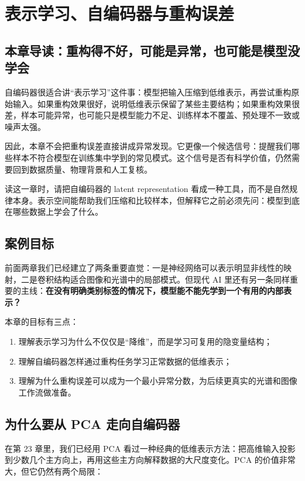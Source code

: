 \chapter{表示学习、自编码器与重构误差}

\section{本章导读：重构得不好，可能是异常，也可能是模型没学会}

自编码器很适合讲“表示学习”这件事：模型把输入压缩到低维表示，再尝试重构原始输入。如果重构效果很好，说明低维表示保留了某些主要结构；如果重构效果很差，样本可能异常，也可能只是模型能力不足、训练样本不覆盖、预处理不一致或噪声太强。

因此，本章不会把重构误差直接讲成异常发现。它更像一个候选信号：提醒我们哪些样本不符合模型在训练集中学到的常见模式。这个信号是否有科学价值，仍然需要回到数据质量、物理背景和人工复核。

读这一章时，请把自编码器的 latent representation 看成一种工具，而不是自然规律本身。表示空间能帮助我们压缩和比较样本，但解释它之前必须先问：模型到底在哪些数据上学会了什么。

\section{案例目标}

前面两章我们已经建立了两条重要直觉：一是神经网络可以表示明显非线性的映射，二是卷积结构适合图像和光谱中的局部模式。但现代 AI 里还有另一条同样重要的主线：\textbf{在没有明确类别标签的情况下，模型能不能先学到一个有用的内部表示？}

本章的目标有三点：

\begin{enumerate}
    \item 理解表示学习为什么不仅仅是“降维”，而是学习可复用的隐变量结构；
    \item 理解自编码器怎样通过重构任务学习正常数据的低维表示；
    \item 理解为什么重构误差可以成为一个最小异常分数，为后续更真实的光谱和图像工作流做准备。
\end{enumerate}

\section{为什么要从 PCA 走向自编码器}

在第 23 章里，我们已经用 PCA 看过一种经典的低维表示方法：把高维输入投影到少数几个主方向上，再用这些主方向解释数据的大尺度变化。PCA 的价值非常大，但它仍然有两个局限：

